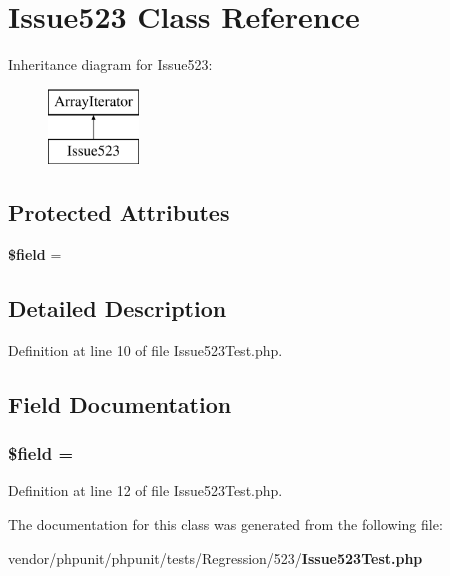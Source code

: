 \section{Issue523 Class Reference}
\label{class_issue523}
Inheritance diagram for Issue523\+:\begin{figure}[H]
\begin{center}
\leavevmode
\includegraphics[height=2.000000cm]{class_issue523}
\end{center}
\end{figure}
\subsection*{Protected Attributes}
\begin{DoxyCompactItemize}
\item 
{\bf \$field} = \textquotesingle{}
\end{DoxyCompactItemize}


\subsection{Detailed Description}


Definition at line 10 of file Issue523\+Test.\+php.



\subsection{Field Documentation}
\subsubsection[{\$field}]{\setlength{\rightskip}{0pt plus 5cm}\$field = \textquotesingle{}\hspace{0.3cm}{\ttfamily [protected]}}\label{class_issue523_a83e4d6721f3491a4fd780dbd3ce1a3c0}


Definition at line 12 of file Issue523\+Test.\+php.



The documentation for this class was generated from the following file\+:\begin{DoxyCompactItemize}
\item 
vendor/phpunit/phpunit/tests/\+Regression/523/{\bf Issue523\+Test.\+php}\end{DoxyCompactItemize}
